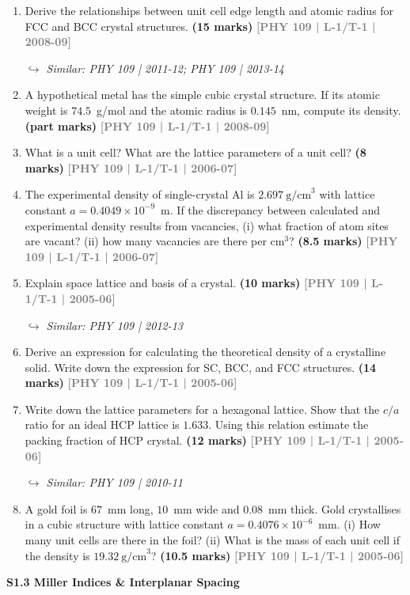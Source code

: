 \documentclass[12pt,a3paper]{article}
\newcommand{\yr}[1]{\hfill\textcolor{gray}{\small\textbf{[#1]}}}
\newcommand{\mk}[1]{\textcolor{orange!70!black}{\small\textbf{(#1 marks)}}}
\newcommand{\variant}[1]{\par\vspace{1pt}\textcolor{blue!50!black}%
  {\footnotesize\textit{$\hookrightarrow$ Similar: #1}}}
\newcommand{\subtopic}[2]{%
  \vspace{10pt}
  \noindent\begin{tcolorbox}[colback=#1!8,colframe=#1,boxrule=0.6pt,arc=4pt,
    left=6pt,right=6pt,top=4pt,bottom=4pt]
    \small\bfseries\textcolor{#1}{#2}
  \end{tcolorbox}
  \vspace{2pt}
}
\begin{document}
\begin{enumerate}
\item Derive the relationships between unit cell edge length and atomic radius for FCC and BCC crystal structures.
\mk{15} \yr{PHY 109 | L-1/T-1 | 2008-09}
\variant{PHY 109 | 2011-12; PHY 109 | 2013-14}

\item A hypothetical metal has the simple cubic crystal structure. If its atomic weight is $74.5$~g/mol and the atomic radius is $0.145$~nm, compute its density.
\mk{part} \yr{PHY 109 | L-1/T-1 | 2008-09}

\item What is a unit cell? What are the lattice parameters of a unit cell?
\mk{8} \yr{PHY 109 | L-1/T-1 | 2006-07}

\item The experimental density of single-crystal Al is $2.697\ \text{g/cm}^3$ with lattice constant $a = 0.4049\times10^{-9}$~m. If the discrepancy between calculated and experimental density results from vacancies, (i) what fraction of atom sites are vacant? (ii) how many vacancies are there per cm$^3$?
\mk{8.5} \yr{PHY 109 | L-1/T-1 | 2006-07}

\item Explain space lattice and basis of a crystal.
\mk{10} \yr{PHY 109 | L-1/T-1 | 2005-06}
\variant{PHY 109 | 2012-13}

\item Derive an expression for calculating the theoretical density of a crystalline solid. Write down the expression for SC, BCC, and FCC structures.
\mk{14} \yr{PHY 109 | L-1/T-1 | 2005-06}

\item Write down the lattice parameters for a hexagonal lattice. Show that the $c/a$ ratio for an ideal HCP lattice is $1.633$. Using this relation estimate the packing fraction of HCP crystal.
\mk{12} \yr{PHY 109 | L-1/T-1 | 2005-06}
\variant{PHY 109 | 2010-11}

\item A gold foil is $67$~mm long, $10$~mm wide and $0.08$~mm thick. Gold crystallises in a cubic structure with lattice constant $a = 0.4076\times10^{-6}$~mm. (i) How many unit cells are there in the foil? (ii) What is the mass of each unit cell if the density is $19.32\ \text{g/cm}^3$?
\mk{10.5} \yr{PHY 109 | L-1/T-1 | 2005-06}

\end{enumerate}
\label{sec:s13}
\subtopic{cA}{S1.3 \quad Miller Indices \& Interplanar Spacing}
\end{document}
